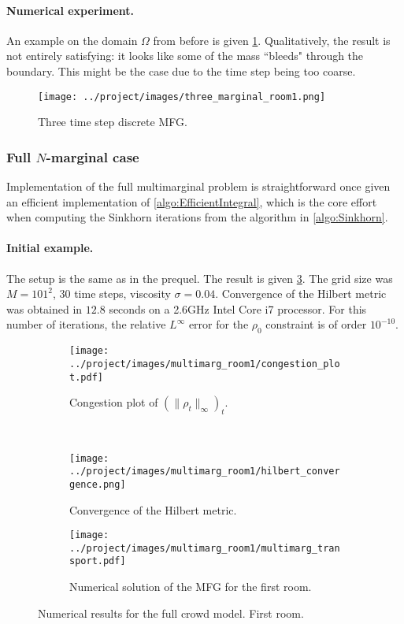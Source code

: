 \documentclass[../report.tex]{subfiles}
\begin{document}
\paragraph{Numerical experiment.} An example on the domain $\Omega$ from before is given \cref{fig:3MargTransport}. Qualitatively, the result is not entirely satisfying: it looks like some of the mass ``bleeds" through the boundary. This might be the case due to the time step being too coarse.

\begin{figure}[!h]
	\centering
	\texttt{[image: ../project/images/three\_marginal\_room1.png]}
	\caption{Three time step discrete MFG.}\label{fig:3MargTransport}
\end{figure}


\subsubsection{Full $N$-marginal case}

Implementation of the full multimarginal problem is straightforward once given an efficient implementation of \cref{algo:EfficientIntegral}, which is the core effort when computing the Sinkhorn iterations from the algorithm in \cref{algo:Sinkhorn}.


\paragraph{Initial example.} The setup is the same as in the prequel. The result is given \cref{fig:NMargEx1Soltn}. The grid size was $M = 101^2$, $30$ time steps, viscosity $\sigma = 0.04$. Convergence of the Hilbert metric was obtained in $12.8$ seconds on a 2.6GHz Intel Core i7 processor. For this number of iterations, the relative $L^\infty$ error for the $\rho_0$ constraint is of order $10^{-10}$.
\begin{figure}[!h]
	\centering
	\begin{subfigure}[c]{.4\linewidth}
	\texttt{[image: ../project/images/multimarg\_room1/congestion\_plot.pdf]}
	\caption{Congestion plot of $(\|\rho_t\|_\infty)_t$.}
	\end{subfigure}~
	\begin{subfigure}[c]{.4\linewidth}
		\texttt{[image: ../project/images/multimarg\_room1/hilbert\_convergence.png]}
		\caption{Convergence of the Hilbert metric.}
	\end{subfigure}
	\begin{subfigure}[c]{.8\linewidth}
		\texttt{[image: ../project/images/multimarg\_room1/multimarg\_transport.pdf]}
		\caption{Numerical solution of the MFG for the first room.}\label{fig:NMargEx1Soltn}
	\end{subfigure}
	\caption{Numerical results for the full crowd model. First room.}
\end{figure}
\end{document}
